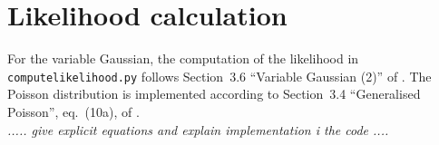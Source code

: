 \clearpage
\section{Likelihood calculation} \label{sec:likelihood}

For the variable Gaussian, the computation of the likelihood in {\tt computelikelihood.py} follows Section~3.6 
``Variable Gaussian (2)'' of \cite{Barlow:2004wg}. 
The Poisson distribution is implemented according to Section~3.4 ``Generalised Poisson'', eq.~(10a), of \cite{Barlow:2004wg}. \\

\noindent
{\em ..... give explicit equations and explain implementation i the code ....}